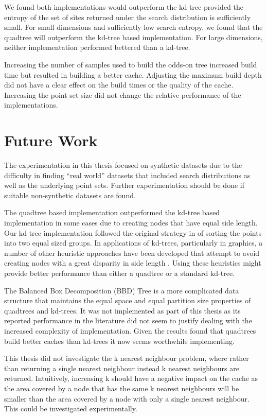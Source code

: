 \documentclass[mcs]{scsthesis}
\begin{document}
We found both implementations would outperform the kd-tree provided the entropy
of the set of sites returned under the search distribution is sufficiently
small. For small dimensions and sufficiently low search entropy, we found that
the quadtree will outperform the kd-tree based implementation. For large
dimensions, neither implementation performed bettered than a kd-tree.

Increasing the number of samples used to build the odds-on tree increased
build time but resulted in building a better cache. Adjusting the maximum
build depth did not have a clear effect on the build times or the quality of the
cache. Increasing the point set size did not change the relative performance
of the implementations.

\section{Future Work}

The experimentation in this thesis focused on synthetic datasets due to the
difficulty in finding ``real world'' datasets that included search distributions
as well as the underlying point sets. Further experimentation should be done
if suitable non-synthetic datasets are found.

The quadtree based implementation outperformed the kd-tree based implementation
in some cases due to creating nodes that have equal side length. Our kd-tree
implementation followed the original strategy in \cite{kdtree} of sorting the
points into two equal sized groups. In applications of kd-trees, particularly
in graphics, a number of other heuristic approaches have been developed that 
attempt to avoid creating nodes with a great disparity in side length
\cite{physicallybasedrendering}. Using these heuristics might provide better
performance than either a quadtree or a standard kd-tree.

The Balanced Box Decomposition (BBD) Tree \cite{optimalann} is a more
complicated data structure that maintains the equal space and equal partition
size properties of quadtrees and kd-trees. It was not implemented as part of
this thesis as its reported performance in the literature did not seem to
justify dealing with the increased complexity of implementation. Given the
results found that quadtrees build better caches than kd-trees it now seems
worthwhile implementing.

This thesis did not investigate the k nearest neighbour problem, where rather
than returning a single nearest neighbour instead k nearest neighbours are
returned. Intuitively, increasing k should have a negative impact on the cache
as the area covered by a node that has the same k nearest neighbours will be
smaller than the area covered by a node with only a single nearest neighbour.
This could be investigated experimentally.
\end{document}
